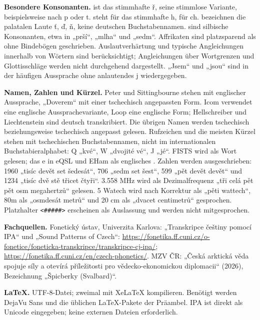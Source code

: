 \documentclass[a4paper,landscape,10pt]{article}
\newcommand{\ipa}[1]{{\ipafont[#1]}}
\begin{document}
\smallskip
\textbf{Besondere Konsonanten.} \ipa{r̝} ist das stimmhafte ř, \ipa{r̝̊} seine stimmlose Variante,
beispielsweise nach p oder t. \ipa{ɦ} steht für das stimmhafte h, \ipa{x} für ch.
\ipa{c, ɟ, ɲ} bezeichnen die palatalen Laute ť, ď, ň, keine deutschen Buchstabennamen.
\ipa{r̩, l̩, m̩} sind silbische Konsonanten, etwa in „prší“, „mlha“ und „sedm“.
Affrikaten sind platzsparend als \ipa{ts, tʃ} ohne Bindebögen geschrieben.
Auslautverhärtung und typische Angleichungen innerhalb von Wörtern sind berücksichtigt;
Angleichungen über Wortgrenzen und Glottisschläge werden nicht durchgehend dargestellt.
„Jsem“ und „jsou“ sind in der häufigen Aussprache ohne anlautendes j wiedergegeben.

\smallskip
\textbf{Namen, Zahlen und Kürzel.} Peter und Sittingbourne stehen mit englischer Aussprache,
„Doverem“ mit einer tschechisch angepassten Form. Icom verwendet eine englische Aussprachevariante,
Loop eine englische Form; Hellschreiber und Liechtenstein sind deutsch transkribiert.
Die übrigen Namen werden tschechisch beziehungsweise tschechisch angepasst gelesen.
Rufzeichen und die meisten Kürzel stehen mit tschechischen Buchstabennamen, nicht im internationalen
Buchstabieralphabet: Q „kvé“, W „dvojité vé“, J „jé“. FISTS wird als Wort gelesen;
das e in eQSL und EHam als englisches \ipa{iː}. Zahlen werden ausgeschrieben:
1960 „tisíc devět set šedesát“, 706 „sedm set šest“, 599 „pět devět devět“ und 1234
„tisíc dvě stě třicet čtyři“. 3.558 MHz wird als Dezimalfrequenz „tři celá pět pět osm megahertzů“ gelesen.
5 Watech wird nach Korrektur als „pěti wattech“, 80m als „osmdesát metrů“ und 20 cm als
„dvacet centimetrů“ gesprochen. Platzhalter \texttt{<\#\#\#\#\#>} erscheinen als Auslassung
und werden nicht mitgesprochen.

\smallskip
\textbf{Fachquellen.} Fonetický ústav, Univerzita Karlova: „Transkripce češtiny pomocí IPA“ und
„Sound Patterns of Czech“:
\url{https://fonetika.ff.cuni.cz/o-fonetice/foneticka-transkripce/transkripce-cj-ipa/};
\url{https://fonetika.ff.cuni.cz/en/czech-phonetics/}.
MZV ČR: „Česká arktická věda spojuje síly a otevírá příležitosti pro vědecko-ekonomickou diplomacii“
(2026), Bezeichnung „Špicberky (Svalbard)“.

\smallskip
\textbf{LaTeX.} UTF-8-Datei; zweimal mit XeLaTeX kompilieren. Benötigt werden DejaVu Sans und die
üblichen LaTeX-Pakete der Präambel. IPA ist direkt als Unicode eingegeben; keine externen Dateien erforderlich.
\end{document}
